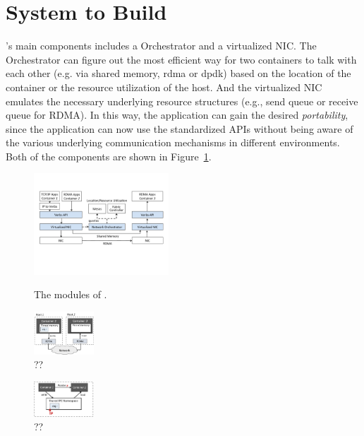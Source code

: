 \section{System to Build} \label{sec:promise}

\sysname's main components includes a Orchestrator and a virtualized NIC.
The Orchestrator can figure out the most efficient way for two containers to talk with each other (e.g. 
via shared memory, rdma or dpdk) based on the location of the container or the resource
utilization of the host.
And the virtualized NIC emulates the necessary underlying resource structures 
(e.g., send queue or receive queue for RDMA). In this way, the application can
gain the desired \emph{portability}, since the application can now use the standardized  
APIs without being aware of the various underlying communication
mechanisms in different environments. 
Both of the components are shown in Figure~\ref{fig:system_modules}.

     \begin{figure}[ht]
     \centering 
     \includegraphics[width=0.45\textwidth]{figures/system/system_modules.pdf}      
     \label{fig:system_modules}
     \caption{The modules of \sysname.} 
     \end{figure}
     
      \begin{figure}[ht]
         \centering 
         \includegraphics[width=0.2\textwidth]{figures/rdma-container.png}   
         \caption{??}   
      \end{figure}
      
      \begin{figure}[ht]
      	\centering 
      	\includegraphics[width=0.2\textwidth]{figures/shared-mem-container.png}   
      	\caption{??}   
      \end{figure}

